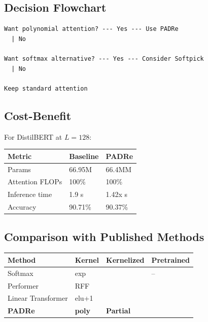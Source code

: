 \subsection{Decision Flowchart}

\begin{lstlisting}
Want polynomial attention? --- Yes --- Use PADRe
  | No
   
Want softmax alternative? --- Yes --- Consider Softpick
  | No
   
Keep standard attention
\end{lstlisting}

\subsection{Cost-Benefit}

For DistilBERT at $L = 128$:

\begin{table}[H]
\centering
\small
\begin{tabular}{lll}
\toprule
\textbf{Metric} & \textbf{Baseline} & \textbf{PADRe} \\
\midrule
Params & 66.95M & 66.4MM \\
Attention FLOPs & 100\% & 100\% \\
Inference time & 1.9 s & 1.42x s \\
Accuracy & 90.71\% & 90.37\% \\
\bottomrule
\end{tabular}
\end{table}

\subsection{Comparison with Published Methods}

\begin{table}[H]
\centering
\small
\begin{tabular}{llll}
\toprule
\textbf{Method} & \textbf{Kernel} & \textbf{Kernelized} & \textbf{Pretrained} \\
\midrule
Softmax & exp &  & -- \\
Performer & RFF &  &  \\
Linear Transformer & elu+1 &  &  \\
\textbf{PADRe} & \textbf{poly} & \textbf{Partial} & \textbf{ } \\
\bottomrule
\end{tabular}
\end{table}

